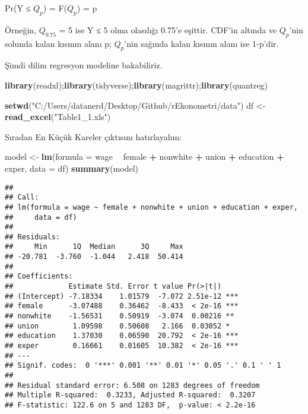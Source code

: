 \documentclass[
]{book}
\newenvironment{Shaded}{\begin{snugshade}}{\end{snugshade}}
\newcommand{\DataTypeTok}[1]{\textcolor[rgb]{0.13,0.29,0.53}{#1}}
\newcommand{\KeywordTok}[1]{\textcolor[rgb]{0.13,0.29,0.53}{\textbf{#1}}}
\newcommand{\NormalTok}[1]{#1}
\newcommand{\OperatorTok}[1]{\textcolor[rgb]{0.81,0.36,0.00}{\textbf{#1}}}
\newcommand{\StringTok}[1]{\textcolor[rgb]{0.31,0.60,0.02}{#1}}
\begin{document}
Pr(Y ≤ \(Q_p\)) = F(\(Q_p\)) = p

Örneğin, \(Q_{0.75}\) = 5 ise Y ≤ 5 olma olasılığı 0.75'e eşittir. CDF'in altında ve \(Q_p\)'nin solunda kalan kısmın alanı p; \(Q_p\)'nin sağında kalan kısmın alanı ise 1-p'dir.

Şimdi dilim regresyon modeline bakabiliriz.

\begin{Shaded}
\begin{Highlighting}[]
\KeywordTok{library}\NormalTok{(readxl);}\KeywordTok{library}\NormalTok{(tidyverse);}\KeywordTok{library}\NormalTok{(magrittr);}\KeywordTok{library}\NormalTok{(quantreg)}

\KeywordTok{setwd}\NormalTok{(}\StringTok{"C:/Users/datanerd/Desktop/Github/rEkonometri/data"}\NormalTok{)}
\NormalTok{df <-}\StringTok{ }\KeywordTok{read_excel}\NormalTok{(}\StringTok{"Table1_1.xls"}\NormalTok{)}
\end{Highlighting}
\end{Shaded}

\begin{Shaded}
\end{Shaded}

Sıradan En Küçük Kareler çıktısını hatırlayalım:

\begin{Shaded}
\begin{Highlighting}[]
\NormalTok{model <-}\StringTok{ }\KeywordTok{lm}\NormalTok{(}\DataTypeTok{formula =}\NormalTok{ wage }\OperatorTok{~}\StringTok{ }\NormalTok{female }\OperatorTok{+}\StringTok{ }\NormalTok{nonwhite }\OperatorTok{+}\StringTok{ }\NormalTok{union }\OperatorTok{+}\StringTok{ }\NormalTok{education }\OperatorTok{+}\StringTok{ }\NormalTok{exper, }\DataTypeTok{data =}\NormalTok{ df)}
\KeywordTok{summary}\NormalTok{(model)}
\end{Highlighting}
\end{Shaded}

\begin{verbatim}
## 
## Call:
## lm(formula = wage ~ female + nonwhite + union + education + exper, 
##     data = df)
## 
## Residuals:
##     Min      1Q  Median      3Q     Max 
## -20.781  -3.760  -1.044   2.418  50.414 
## 
## Coefficients:
##             Estimate Std. Error t value Pr(>|t|)    
## (Intercept) -7.18334    1.01579  -7.072 2.51e-12 ***
## female      -3.07488    0.36462  -8.433  < 2e-16 ***
## nonwhite    -1.56531    0.50919  -3.074  0.00216 ** 
## union        1.09598    0.50608   2.166  0.03052 *  
## education    1.37030    0.06590  20.792  < 2e-16 ***
## exper        0.16661    0.01605  10.382  < 2e-16 ***
## ---
## Signif. codes:  0 '***' 0.001 '**' 0.01 '*' 0.05 '.' 0.1 ' ' 1
## 
## Residual standard error: 6.508 on 1283 degrees of freedom
## Multiple R-squared:  0.3233, Adjusted R-squared:  0.3207 
## F-statistic: 122.6 on 5 and 1283 DF,  p-value: < 2.2e-16
\end{verbatim}
\end{document}

